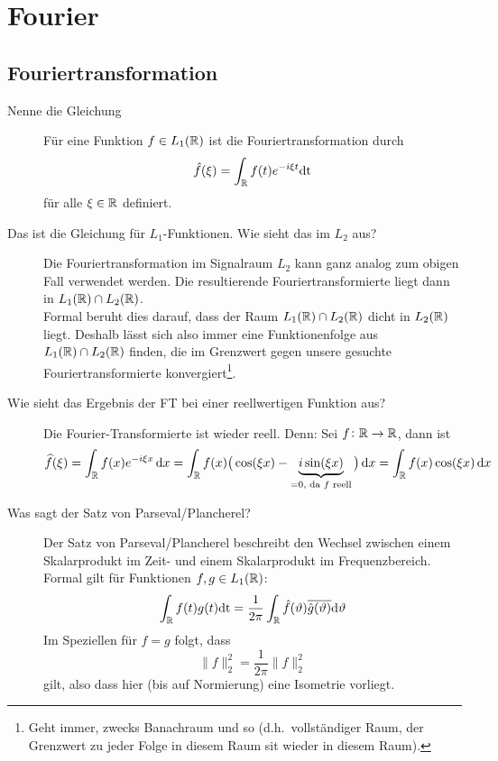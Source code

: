 \section{Fourier}
\subsection{Fouriertransformation}
\begin{description}
	\item[Nenne die Gleichung]
      Für eine Funktion $f \in L_1(\mathbb{R})$ ist die Fouriertransformation durch
      $$ \hat f(\xi) = \int_{\mathbb{R}} f(t) e^{-i\xi t}\text{dt} $$
      für alle $\xi \in \mathbb{R}$ definiert.
    \item[Das ist die Gleichung für $L_1$-Funktionen. Wie sieht das im $L_2$ aus?]
      Die Fouriertransformation im Signalraum $L_2$ kann ganz analog zum obigen Fall verwendet werden.
      Die resultierende Fouriertransformierte liegt dann in $L_1(\mathbb{R}) \cap L_2(\mathbb{R})$.\\
      Formal beruht dies darauf, dass der Raum $L_1(\mathbb{R})\cap L_2(\mathbb{R})$ dicht in $L_2(\mathbb{R})$ liegt. Deshalb
      lässt sich also immer eine Funktionenfolge aus $L_1(\mathbb{R})\cap L_2(\mathbb{R})$ finden, die im Grenzwert
      gegen unsere gesuchte Fouriertransformierte konvergiert\footnote{Geht immer, zwecks 
      Banachraum und so (d.h.\ vollständiger Raum, der Grenzwert zu jeder Folge in diesem Raum sit 
      wieder in diesem Raum).}.
	\item[Wie sieht das Ergebnis der FT bei einer reellwertigen Funktion aus?]
  	Die Fourier-Transformierte ist wieder reell. Denn: Sei $ f \colon \mathbb{R} \rightarrow \mathbb{R} $, dann ist
    \[
    	 \widehat{f}(\xi)
  	= \int_{\R} f(x) e^{-i\xi x} \dif x \\
  	= \int_{\R} f(x) \big(
          \cos(\xi x) - \underbrace{i \sin(\xi x)}_{= 0, \text{ da $ f $ reell}}
       \big)  \dif x \\
    = \int_{\R} f(x) \cos(\xi x) \dif x
    \]
  \item[Was sagt der Satz von Parseval/Plancherel?]
    Der Satz von Parseval/Plancherel beschreibt den Wechsel zwischen einem 
    Skalarprodukt im Zeit- und einem Skalarprodukt im Frequenzbereich.\\
    Formal gilt für Funktionen $f, g \in L_1(\mathbb{R})$:
    $$ \int_{\mathbb{R}} f(t)g(t)\text{dt} = \frac{1}{2\pi}\int_{\mathbb{R}}\hat f(\vartheta)\overline{\hat 
    g(\vartheta)}\text{d} \vartheta $$
    Im Speziellen für $f=g$ folgt, dass
    $$ \|f\|_2^2 = \frac{1}{2\pi}\|\hat f\|_2^2 $$
    gilt, also dass hier (bis auf Normierung) eine Isometrie vorliegt.

\end{description}
